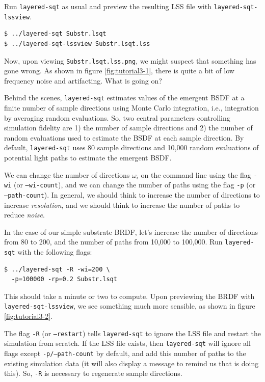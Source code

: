 \documentclass[
    twoside,
    twocolumn,
    letterpaper,
    10pt]{article}
\begin{document}
Run \texttt{layered-sqt} as usual and preview the resulting LSS 
file with \texttt{layered-sqt-lssview}.
\begin{verbatim}
$ ../layered-sqt Substr.lsqt
$ ../layered-sqt-lssview Substr.lsqt.lss
\end{verbatim}
Now, upon viewing \texttt{Substr.lsqt.lss.png}, we might suspect that 
something has gone wrong. As shown in figure \ref{fig:tutorial3-1},
there is quite a bit of low frequency noise and artifacting. What is
going on?

Behind the scenes, \texttt{layered-sqt} estimates values of the emergent 
BSDF at a finite number of sample directions using Monte Carlo integration, 
i.e., integration by averaging random evaluations. So, two central parameters 
controlling simulation fidelity are 1) the number of sample directions and 2) 
the number of random evaluations used to estimate the BSDF at each sample 
direction. By default, \texttt{layered-sqt} uses 80 sample directions and
10,000 random evaluations of potential light paths to estimate the 
emergent BSDF. 

We can change the number of directions $\omega_i$ on the command line 
using the flag \texttt{-wi} (or \texttt{--wi-count}), and we can change the
number of paths using the flag \texttt{-p} (or \texttt{--path-count}).
In general, we should think to increase the number of directions
to increase \emph{resolution}, and we should think to increase the number 
of paths to reduce \emph{noise}.

In the case of our simple substrate BRDF, let's increase the number 
of directions from 80 to 200, and the number of paths from 10,000 to 
100,000. Run \texttt{layered-sqt} with the following flags:
\begin{verbatim}
$ ../layered-sqt -R -wi=200 \
  -p=100000 -rp=0.2 Substr.lsqt
\end{verbatim}
This should take a minute or two to compute. Upon previewing the BRDF with
\texttt{layered-sqt-lssview}, we see something much more sensible, as shown
in figure \ref{fig:tutorial3-2}.

The flag \texttt{-R} (or \texttt{--restart}) tells \texttt{layered-sqt}
to ignore the LSS file and restart the simulation from scratch. 
If the LSS file exists, then \texttt{layered-sqt} will ignore all flags except 
\texttt{-p/--path-count} by default, and add this number of paths to the existing
simulation data (it will also display a message to remind us that is doing
this). So, \texttt{-R} is necessary to regenerate sample directions. 
\end{document}
